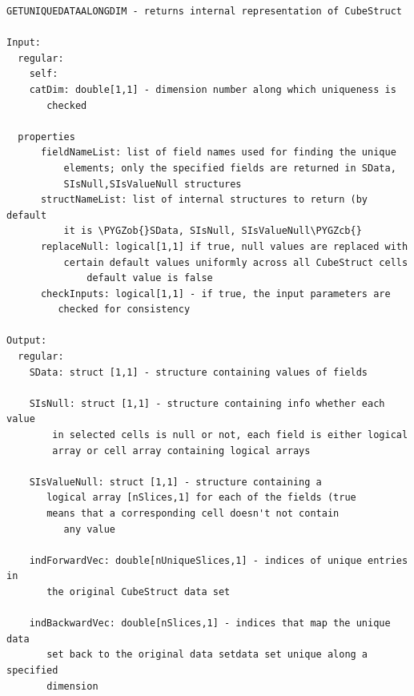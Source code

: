\documentclass[letterpaper,10pt,english]{sphinxmanual}
\def\PYGZob{\char`\{}
\def\PYGZcb{\char`\}}
\begin{document}
\label{chap_func:smartdb-relations-atypifiedstaticrelation-getuniquedataalongdim}
\begin{Verbatim}[commandchars=\\\{\}]
GETUNIQUEDATAALONGDIM - returns internal representation of CubeStruct

Input:
  regular:
    self:
    catDim: double[1,1] - dimension number along which uniqueness is
       checked

  properties
      fieldNameList: list of field names used for finding the unique
          elements; only the specified fields are returned in SData,
          SIsNull,SIsValueNull structures
      structNameList: list of internal structures to return (by default
          it is \PYGZob{}SData, SIsNull, SIsValueNull\PYGZcb{}
      replaceNull: logical[1,1] if true, null values are replaced with
          certain default values uniformly across all CubeStruct cells
              default value is false
      checkInputs: logical[1,1] - if true, the input parameters are
         checked for consistency

Output:
  regular:
    SData: struct [1,1] - structure containing values of fields

    SIsNull: struct [1,1] - structure containing info whether each value
        in selected cells is null or not, each field is either logical
        array or cell array containing logical arrays

    SIsValueNull: struct [1,1] - structure containing a
       logical array [nSlices,1] for each of the fields (true
       means that a corresponding cell doesn't not contain
          any value

    indForwardVec: double[nUniqueSlices,1] - indices of unique entries in
       the original CubeStruct data set

    indBackwardVec: double[nSlices,1] - indices that map the unique data
       set back to the original data setdata set unique along a specified
       dimension
\end{Verbatim}
\label{chap_func:smartdb-relations-atypifiedstaticrelation-getuniquetuples}
\end{document}
